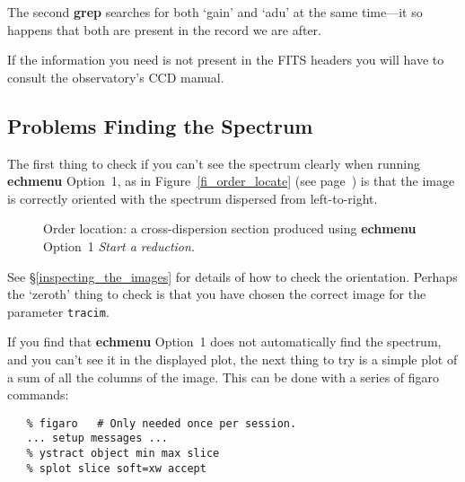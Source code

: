 \documentclass[twoside,11pt]{article}
\newcommand{\htmlref}[2]{#1}
\newcommand{\xref}[3]{#1}
\newcommand{\xlabel}[1]{}
\newcommand{\mlabel}[1]{\xlabel{#1}\label{#1}}
\newcommand{\scspec}[2]{#1}
\newcommand{\scspec}[2]{#2}
\begin{document}
The second {\bf grep} searches for both `gain' and `adu' at the same
time\scspec{---}{ - }it so happens that both are present in the record
we are after.

If the information you need is not present in the FITS
headers you will have to consult the observatory's CCD manual.

\subsection{\mlabel{cook_finding_the_spectrum}Problems Finding the Spectrum}

The first thing to check if you can't see the spectrum clearly when
running \xref{{\bf echmenu}}{sun152}{ECHMENU}
\xref{Option~1}{sun152}{option1}, as in
\scspec{Figure~\ref{fi_order_locate} (see page~\pageref{fi_order_locate})}
{the figure below,} is that the
image is correctly oriented with the spectrum dispersed from left-to-right.

\begin{htmlonly}
\begin{figure}
\begin{center}
  \leavevmode\epsfysize=136mm

  \parbox{140mm}{
    \caption{Order location: a cross-dispersion section produced using
             {\bf echmenu} Option~1 {\sl Start a reduction.}}
    \label{fi_order_locate_again}
  }
\end{center}
\end{figure}
\end{htmlonly}

See \scspec{\S\ref{inspecting_the_images}}
{\htmlref{Inspecting the Images}{inspecting_the_images}} for details of how
to check the orientation.  Perhaps the `zeroth' thing to check is that you
have chosen the correct image for the parameter
\xref{{\tt{tracim}}}{sun152}{par_TRACIM}\@.

If you find that {\bf echmenu} Option~1 does not automatically find the
spectrum, and you can't see it in the displayed plot, the next thing to
try is a simple plot of a sum of all the columns of the image.  This can
be done with a series of \xref{{\sc figaro}}{sun86}{} commands:

{
\scspec{\small}{ }
\begin{verbatim}
   % figaro   # Only needed once per session.
   ... setup messages ...
   % ystract object min max slice
   % splot slice soft=xw accept
\end{verbatim}
}
\end{document}
